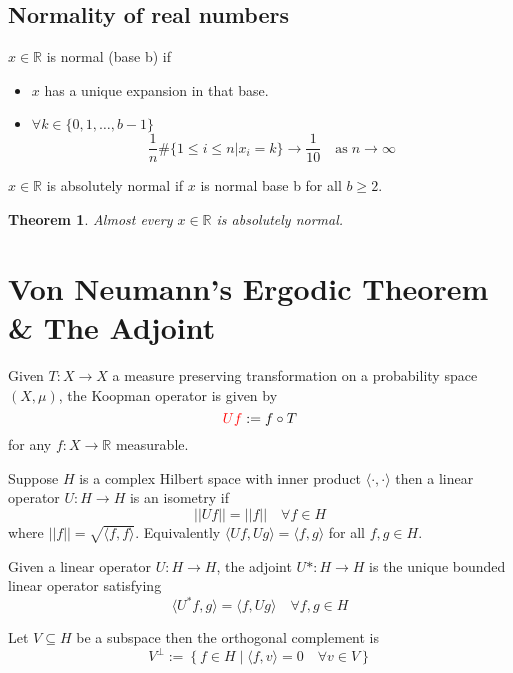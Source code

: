 \documentclass[11pt]{article}
\newcommand{\defeq}{:=}
\newcommand{\norm}[1]{\left|\left|#1\right|\right|}
\newcommand{\relmiddle}[1]{\mathrel{}\middle#1\mathrel{}}
\newcommand{\rmv}{\relmiddle|}
\newcommand{\R}{\mathbb{R}}
\newenvironment{defin}
	{\begin{mdframed}[backgroundcolor=white, roundcorner=5pt, linewidth=1pt]}
	{\end{mdframed}}
\newcommand{\mdf}[1]{{\color{red} #1}}
\newtheorem{theorem}[prop]{Theorem}
\begin{document}
\subsection{Normality of real numbers}
\begin{defin}
$x\in\R$ is \mdf{normal (base b)} if
\begin{itemize}
	\item $x$ has a  unique expansion in that base.
	\item $\forall k\in\{0,1,\dots,b-1\}$
		$$\frac{1}{n}\#\{1\leq i\leq n | x_i=k\}\to\frac{1}{10}\quad\text{as}\;n\to\infty$$
\end{itemize}

$x\in\R$ is \mdf{absolutely normal} if $x$ is normal base b for all $b\geq 2$.
\end{defin}
\begin{theorem}
Almost every $x\in\R$ is absolutely normal.
\end{theorem}

\section{Von Neumann's Ergodic Theorem \& The Adjoint}

\begin{defin}
	Given $T:X\to X$ a measure preserving transformation on a probability space $(X, \mu)$, the \mdf{Koopman operator} is given by
	\[
		\mdf{Uf}\defeq f\circ T
	\]
	for any $f:X\to \R$ measurable.


	Suppose $H$ is a complex Hilbert space with inner product $\langle\cdot, \cdot\rangle$ then a linear operator $U:H\to H$ is an \mdf{isometry} if
	\[
		\norm{Uf}=\norm{f}\quad\forall f\in H
	\]
	where $\norm{f}=\sqrt{\langle f, f\rangle}$.
	Equivalently $\langle Uf, Ug \rangle= \langle f, g\rangle$ for all $f,g \in H$.

	Given a linear operator $U:H\to H$, the \mdf{adjoint} $U*:H\to H$ is the unique bounded linear operator satisfying
	\[
\langle U^\ast f, g \rangle= \langle f, Ug \rangle \quad \forall f, g \in H
	\]

	Let $V\subseteq H$ be a subspace then the \mdf{orthogonal complement} is
	\[
		V^\perp \defeq \left\{ f\in H \rmv \langle f, v \rangle =0 \quad \forall v \in V\right\}
	\]
\end{defin}
\end{document}
